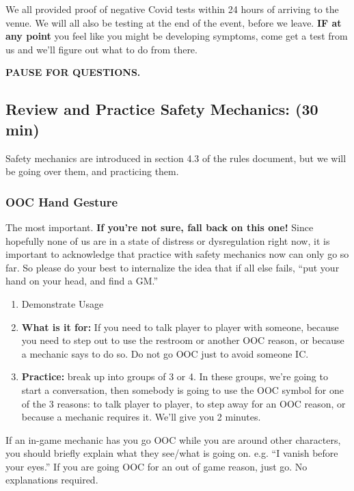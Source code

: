 \documentclass[green]{GL2020}
\begin{document}
We all provided proof of negative Covid tests within 24 hours of arriving to the venue. We will all also be testing at the end of the event, before we leave. \textbf{IF at any point} you feel like you might be developing symptoms, come get a test from us and we'll figure out what to do from there.

\textbf{PAUSE FOR QUESTIONS.}

\subsection*{Review and Practice Safety Mechanics: (30 min)}
Safety mechanics are introduced in section 4.3 of the rules document, but we will be going over them, and practicing them. 


\subsubsection*{OOC Hand Gesture}
The most important. \textbf{If you’re not sure, fall back on this one!} Since hopefully none of us are in a state of distress or dysregulation right now, it is important to acknowledge that practice with safety mechanics now can only go so far. So please do your best to internalize the idea that if all else fails, ``put your hand on your head, and find a GM.''

\begin{enumerate}
	\item Demonstrate Usage
	\item \textbf{What is it for:} If you need to talk player to player with someone, because you need to step out to use the restroom or another OOC reason, or because a mechanic says to do so. Do not go OOC just to avoid someone IC.
	\item \textbf{Practice:} break up into groups of 3 or 4. In these groups, we’re going to start a conversation, then somebody is going to use the OOC symbol for one of the 3 reasons: to talk player to player, to step away for an OOC reason, or because a mechanic requires it. We’ll give you 2 minutes.
\end{enumerate}
	
If an in-game mechanic has you go OOC while you are around other characters, you should briefly explain what they see/what is going on. e.g. ``I vanish before your eyes.'' If you are going OOC for an out of game reason, just go. No explanations required.
\end{document}
